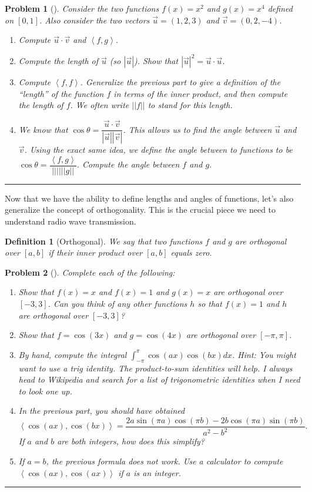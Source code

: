 \documentclass[letterpaper,oneside]{book}%
\theoremstyle{plain}
\theoremstyle{box}
\newtheorem{definition}[theorem]{Definition}
\theoremstyle{problem}
\newtheorem{problemnum}{Problem}[chapter]
\newenvironment{problem}[1][]{\begin{problemnum}[#1]}{\end{problemnum}\nopagebreak\hrule\bigskip}
\begin{document}
\begin{problem}
 Consider the two functions $f(x) = x^2$ and $g(x) = x^4$ defined on $[0,1]$. Also consider the two vectors $\vec u = (1,2,3)$ and $\vec v = (0,2,-4)$.  
 \begin{enumerate}
  \item Compute $\vec u\cdot \vec v$ and $\left<f,g\right>$. 
  \item Compute the length of $\vec u$ (so $|\vec u|$). Show that $|\vec u|^2 = \vec u\cdot \vec u$.
  \item Compute $\left<f,f\right>$. Generalize the previous part to give a definition of the ``length'' of the function $f$ in terms of the inner product, and then compute the length of $f$.  We often write $||f||$ to stand for this length.
  \item We know that $\cos\theta = \dfrac{\vec u\cdot \vec v}{|\vec u||\vec v|}$. This allows us to find the angle between $\vec u$ and $\vec v$. 
  Using the exact same idea, we define the angle between to functions to be $\cos \theta = \dfrac{\left<f,g\right>}{||||||g||}$. Compute the angle between $f$ and $g$. 
 \end{enumerate}


\end{problem}


Now that we have the ability to define lengths and angles of functions, let's also generalize the concept of orthogonality. This is the crucial piece we need to understand radio wave transmission.
\begin{definition}[Orthogonal]
We say that two functions $f$ and $g$ are orthogonal over $[a,b]$ if their inner product over $[a,b]$ equals zero.   
\end{definition}


\begin{problem}
 Complete each of the following:
 \begin{enumerate}
  \item Show that $f(x) = x$ and $f(x)=1$ and $g(x) = x$ are orthogonal over $[-3,3]$. Can you think of any other functions $h$ so that $f(x)=1$ and $h$ are orthogonal over $[-3,3]$?
  \item Show that $f=\cos(3x)$ and $g=\cos(4x)$ are orthogonal over $[-\pi,\pi]$.
  \item By hand, compute the integral $\int_{-\pi}^{\pi}\cos(ax)\cos(bx)dx$.  Hint: You might want to use a trig identity.  The product-to-sum identities will help.  I always head to Wikipedia and search for a list of trigonometric identities when I need to look one up.
  \item In the previous part, you should have obtained $$\left<\cos(ax),\cos(bx)\right>=\frac{2 a \sin (\pi  a) \cos (\pi  b)-2 b \cos (\pi  a) \sin (\pi 
   b)}{a^2-b^2}.$$
   If $a$ and $b$ are both integers, how does this simplify?
  \item If $a=b$, the previous formula does not work. Use a calculator to compute $\left<\cos(ax),\cos(ax)\right>$ if $a$ is an integer.
 \end{enumerate}

\end{problem}
\end{document}
